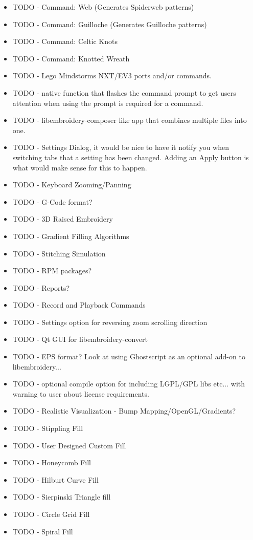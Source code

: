 \documentclass{report}
\begin{document}
\begin{itemize}
\item TODO - Command: Web (Generates Spiderweb patterns)
\item TODO - Command: Guilloche (Generates Guilloche patterns)
\item TODO - Command: Celtic Knots
\item TODO - Command: Knotted Wreath
\item TODO - Lego Mindstorms NXT/EV3 ports and/or commands.
\item TODO - native function that flashes the command prompt to get users attention when using the prompt is required for a command.
\item TODO - libembroidery-composer like app that combines multiple files into one.
\item TODO - Settings Dialog, it would be nice to have it notify you when switching tabs that a setting has been changed. Adding an Apply button is what would make sense for this to happen. 
\item TODO - Keyboard Zooming/Panning
\item TODO - G-Code format?
\item TODO - 3D Raised Embroidery
\item TODO - Gradient Filling Algorithms
\item TODO - Stitching Simulation
\item TODO - RPM packages?
\item TODO - Reports?
\item TODO - Record and Playback Commands
\item TODO - Settings option for reversing zoom scrolling direction
\item TODO - Qt GUI for libembroidery-convert
\item TODO - EPS format? Look at using Ghostscript as an optional add-on to libembroidery...
\item TODO - optional compile option for including LGPL/GPL libs etc... with warning to user about license requirements.
\item TODO - Realistic Visualization - Bump Mapping/OpenGL/Gradients?
\item TODO - Stippling Fill
\item TODO - User Designed Custom Fill
\item TODO - Honeycomb Fill
\item TODO - Hilburt Curve Fill
\item TODO - Sierpinski Triangle fill
\item TODO - Circle Grid Fill
\item TODO - Spiral Fill

\end{itemize}
\end{document}
